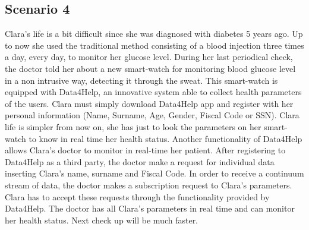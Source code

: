     \subsection{Scenario 4}
    Clara's life is a bit difficult since she was diagnosed with diabetes 5 years ago.
    Up to now she used the traditional method consisting of a blood injection three times a day, every day, to monitor her glucose level.
    During her last periodical check, the doctor told her about a new smart-watch for monitoring blood glucose level in a non intrusive way, detecting it through the sweat.
    This smart-watch is equipped with Data4Help, an innovative system able to collect health parameters of the users.
    Clara must simply download Data4Help app and register with her personal information (Name, Surname, Age, Gender, Fiscal Code or SSN).
    Clara life is simpler from now on, she has just to look the parameters on her smart-watch to know in real time her health status.
    Another functionality of Data4Help allows Clara's doctor to monitor in real-time her patient. After registering to Data4Help as a third party, the doctor make a request for individual data inserting Clara's name, surname and Fiscal Code. In order to receive a continuum stream of data, the doctor makes a subscription request to Clara's parameters.
    Clara has to accept these requests through the functionality provided by Data4Help.
    The doctor has all Clara's parameters in real time and can monitor her health status.
    Next check up will be much faster.
    
